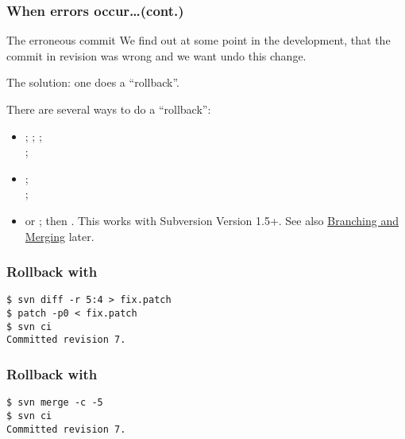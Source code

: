 \begin{frame}[fragile]
    \frametitle{When errors occur\ldots (cont.)}
    \linuxframe
    \begin{alertblock}{The erroneous commit}
        We find out at some point in the development, that the commit in
        revision  was wrong and we want undo this change.

        The solution: one does a \enquote{rollback}.

        There are several ways to do a \enquote{rollback}:
        \begin{itemize}
            \item {}; ;
                ;\\
                ; 
            \item {};\\
                ; 
            \item {} or
                ; then
                .  This works with Subversion Version 1.5+.
                See also \hyperlink{branch-merge}{\alert{Branching and
                Merging}} later.
        \end{itemize}
    \end{alertblock}
\end{frame}

\begin{frame}[fragile]
\frametitle{Rollback with }
\linuxframe

\begin{center}
    \resizebox{\textwidth}{!}{
        
    }
\end{center}

\begin{lstlisting}
$ svn diff -r 5:4 > fix.patch
$ patch -p0 < fix.patch
$ svn ci
Committed revision 7.
\end{lstlisting}

\end{frame}

\begin{frame}[fragile]
\frametitle{Rollback with }
\linuxframe

\begin{center}
    \resizebox{\textwidth}{!}{
        
    }
\end{center}

\begin{lstlisting}
$ svn merge -c -5
$ svn ci
Committed revision 7.
\end{lstlisting}

\end{frame}

